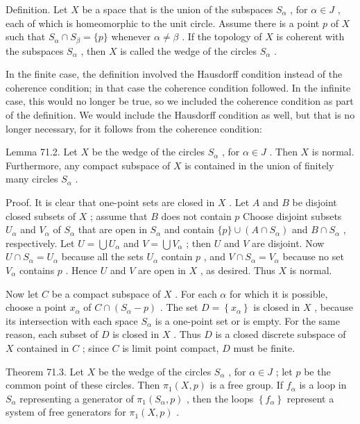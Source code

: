 \documentclass[10pt]{article}
\begin{document}
Definition. Let \(X\) be a space that is the union of the subspaces \({S}_{\alpha }\) , for \(\alpha  \in  J\) , each of which is homeomorphic to the unit circle. Assume there is a point \(p\) of \(X\) such that \({S}_{\alpha } \cap  {S}_{\beta } = \{ p\}\) whenever \(\alpha  \neq  \beta\) . If the topology of \(X\) is coherent with the subspaces \({S}_{\alpha }\) , then \(X\) is called the wedge of the circles \({S}_{\alpha }\) .

In the finite case, the definition involved the Hausdorff condition instead of the coherence condition; in that case the coherence condition followed. In the infinite case, this would no longer be true, so we included the coherence condition as part of the definition. We would include the Hausdorff condition as well, but that is no longer necessary, for it follows from the coherence condition:

Lemma 71.2. Let \(X\) be the wedge of the circles \({S}_{\alpha }\) , for \(\alpha  \in  J\) . Then \(X\) is normal. Furthermore, any compact subspace of \(X\) is contained in the union of finitely many circles \({S}_{\alpha }\) .

Proof. It is clear that one-point sets are closed in \(X\) . Let \(A\) and \(B\) be disjoint closed subsets of \(X\) ; assume that \(B\) does not contain \(p\) Choose disjoint subsets \({U}_{\alpha }\) and \({V}_{\alpha }\) of \({S}_{\alpha }\) that are open in \({S}_{\alpha }\) and contain \(\{ p\}  \cup  \left( {A \cap  {S}_{\alpha }}\right)\) and \(B \cap  {S}_{\alpha }\) , respectively. Let \(U = \bigcup {U}_{\alpha }\) and \(V = \bigcup {V}_{\alpha }\) ; then \(U\) and \(V\) are disjoint. Now \(U \cap  {S}_{\alpha } = {U}_{\alpha }\) because all the sets \({U}_{\alpha }\) contain \(p\) , and \(V \cap  {S}_{\alpha } = {V}_{\alpha }\) because no set \({V}_{\alpha }\) contains \(p\) . Hence \(U\) and \(V\) are open in \(X\) , as desired. Thus \(X\) is normal.

Now let \(C\) be a compact subspace of \(X\) . For each \(\alpha\) for which it is possible, choose a point \({x}_{\alpha }\) of \(C \cap  \left( {{S}_{\alpha } - p}\right)\) . The set \(D = \left\{  {x}_{\alpha }\right\}\) is closed in \(X\) , because its intersection with each space \({S}_{\alpha }\) is a one-point set or is empty. For the same reason, each subset of \(D\) is closed in \(X\) . Thus \(D\) is a closed discrete subspace of \(X\) contained in \(C\) ; since \(C\) is limit point compact, \(D\) must be finite.

Theorem 71.3. Let \(X\) be the wedge of the circles \({S}_{\alpha }\) , for \(\alpha  \in  J\) ; let \(p\) be the common point of these circles. Then \({\pi }_{1}\left( {X,p}\right)\) is a free group. If \({f}_{\alpha }\) is a loop in \({S}_{\alpha }\) representing a generator of \({\pi }_{1}\left( {{S}_{\alpha },p}\right)\) , then the loops \(\left\{  {f}_{\alpha }\right\}\) represent a system of free generators for \({\pi }_{1}\left( {X,p}\right)\) .
\end{document}
